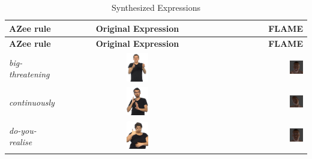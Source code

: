 \documentclass[../main.tex]{subfiles}
\begin{document}
\begin{longtable}{|l|c|r|}
    \caption{Synthesized Expressions} \label{tab:facial_expressions} \\
    \hline
    \textbf{AZee rule} & \textbf{Original Expression} & \textbf{FLAME}  \\
    \hline
    \endfirsthead

    \hline
    \textbf{AZee rule} & \textbf{Original Expression} & \textbf{FLAME} \\
    \hline
    \endhead

    \hline
    \endfoot

    \hline
    \endlastfoot

    \emph{big-threatening} & \includegraphics[width=0.15\textwidth]{chapters/facial_expressions/images/original_facial_expressions/big_threatening.png} & \includegraphics[width=0.15\textwidth]{chapters/facial_expressions/images/flame_facial_exps/big_threatening.png} \\
    \emph{continuously} & \includegraphics[width=0.15\textwidth]{chapters/facial_expressions/images/original_facial_expressions/continuously.png} & \includegraphics[width=0.15\textwidth]{chapters/facial_expressions/images/flame_facial_exps/continuously.png} \\
    \emph{do-you-realise} & \includegraphics[width=0.15\textwidth]{chapters/facial_expressions/images/original_facial_expressions/do_you_realise.png} & \includegraphics[width=0.15\textwidth]{chapters/facial_expressions/images/flame_facial_exps/do_you_realise.png} \\

\end{longtable}
\end{document}
